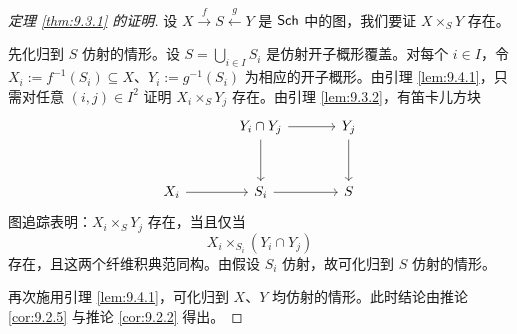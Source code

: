 \begin{proof}[定理 \ref{thm:9.3.1} 的证明]
设 $X \xrightarrow{f} S \xleftarrow{g} Y$ 是 $\mathsf{Sch}$ 中的图，我们要证 $X \times_S Y$ 存在。

先化归到 $S$ 仿射的情形。设 $S = \bigcup_{i \in I} S_i$ 是仿射开子概形覆盖。对每个 $i \in I$，令 $X_i := f^{-1}(S_i) \subseteq X$、$Y_i := g^{-1}(S_i)$ 为相应的开子概形。由引理 \ref{lem:9.4.1}，只需对任意 $(i,j) \in I^2$ 证明 $X_i \times_S Y_j$ 存在。由引理 \ref{lem:9.3.2}，有笛卡儿方块
\[
\begin{tikzcd}[column sep=3.4em,row sep=3em]
& Y_i \cap Y_j \arrow[r] \arrow[d] & Y_j \arrow[d]\\
X_i \arrow[r] & S_i \arrow[r] & S
\end{tikzcd}
\]
图追踪表明：$X_i \times_S Y_j$ 存在，当且仅当
\[
X_i \times_{S_i} (Y_i \cap Y_j)
\]
存在，且这两个纤维积典范同构。由假设 $S_i$ 仿射，故可化归到 $S$ 仿射的情形。

再次施用引理 \ref{lem:9.4.1}，可化归到 $X$、$Y$ 均仿射的情形。此时结论由推论 \ref{cor:9.2.5} 与推论 \ref{cor:9.2.2} 得出。
\end{proof}

